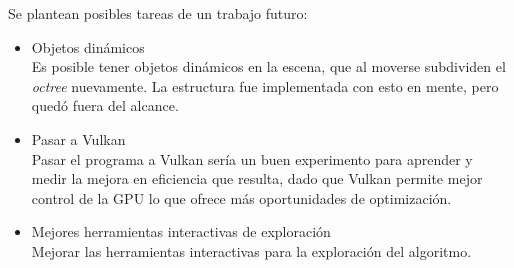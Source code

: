 Se plantean posibles tareas de un trabajo futuro:
\begin{itemize}
    \item Objetos dinámicos\\
        Es posible tener objetos dinámicos en la escena, que al moverse subdividen el \textit{octree} nuevamente.
        La estructura fue implementada con esto en mente, pero quedó fuera del alcance.
    \item Pasar a Vulkan\\
        Pasar el programa a Vulkan sería un buen experimento para aprender y medir la mejora en eficiencia que resulta, dado que Vulkan permite mejor control de la GPU lo que ofrece más oportunidades de optimización.
    \item Mejores herramientas interactivas de exploración\\
        Mejorar las herramientas interactivas para la exploración del algoritmo.
\end{itemize}
